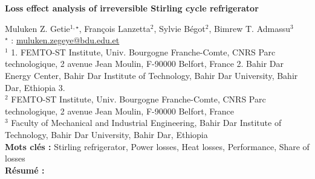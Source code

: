 


    \newpage


%
\begin{flushleft}
\addtocounter{section}{1}
{\Large \textbf{Loss effect analysis of irreversible Stirling cycle refrigerator}}\label{ref:35}
\end{flushleft}
%
Muluken Z. Getie$^{1,\star}$, François Lanzetta$^{2}$, Sylvie Bégot$^{2}$, Bimrew T. Admassu$^{3}$\\[2mm]
$^{\star}$ \Letter : \url{muluken.zegeye@bdu.edu.et}\\[2mm]
{\footnotesize $^{1}$ 1.  FEMTO-ST Institute, Univ. Bourgogne Franche-Comte, CNRS Parc technologique, 2 avenue Jean Moulin, F-90000 Belfort, France            2. Bahir Dar Energy Center, Bahir Dar Institute of Technology, Bahir Dar University, Bahir Dar, Ethiopia           3.}\\
{\footnotesize $^{2}$ FEMTO-ST Institute, Univ. Bourgogne Franche-Comte, CNRS Parc technologique, 2 avenue Jean Moulin, F-90000 Belfort, France}\\
{\footnotesize $^{3}$ Faculty of Mechanical and Industrial Engineering, Bahir Dar Institute of Technology, Bahir Dar University, Bahir Dar, Ethiopia}\\
[4mm]
%
\noindent \textbf{Mots clés : } Stirling refrigerator, Power losses, Heat losses, Performance, Share of losses\\[4mm]
%
\noindent \textbf{Résumé : } 

